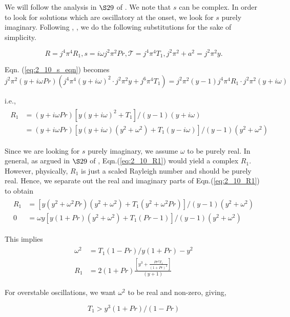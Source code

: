 We will follow the analysis in $\S 29$ of \cite{chandrasekhar1961hydrodynamic}. We note that $s$ can be complex. In order to look for solutions which are oscillatory at the onset, we look for $s$ purely imaginary. Following \cite{chandrasekhar1961hydrodynamic}, \cite{drazin2004hydrodynamic}, we do the following substitutions for the sake of simplicity. 

\begin{equation}\label{eq:2_10_substitutions}
 R = j^{4}\pi^{4}R_{1}, s = i \omega j^{2}\pi^{2} Pr, \mathcal{T} = j^{4}\pi^{4}T_{1}, j^{2}\pi^{2} + a^{2} = j^{2}\pi^{2} y.
\end{equation}

Eqn. (\ref{eq:2_10_s_eqn}) becomes
\begin{equation*}
 j^{2}\pi^{2}(y + i\omega Pr)\left(j^{4}\pi^{4}(y + i\omega)^{2} \cdot j^{2}\pi^{2}y + j^{6}\pi^{4}T_{1}\right) = j^{2}\pi^{2} (y-1)j^{4}\pi^{4}R_{1}\cdot j^{2}\pi^{2}(y + i\omega) 
\end{equation*}

i.e.,
\begin{align}\label{eq:2_10_R1}
 \begin{split}
  R_{1} &= (y + i\omega Pr)\left[y(y + i\omega)^{2} + T_{1} \right]/(y-1)(y+i\omega) \\
  & = (y + i\omega Pr)\left[y(y + i\omega)(y^{2}+\omega^{2}) + T_{1}(y-i\omega)\right]/(y-1)(y^{2}+\omega^{2})
 \end{split}
\end{align}

Since we are looking for $s$ purely imaginary, we assume $\omega$ to be purely real. In general, as argued in $\S 29$ of \cite{chandrasekhar1961hydrodynamic}, Eqn.(\ref{eq:2_10_R1}) would yield a complex $R_{1}$. However, physically, $R_{1}$ is just a scaled Rayleigh number and should be purely real. Hence, we separate out the real and imaginary parts of Eqn.(\ref{eq:2_10_R1}) to obtain
\begin{align}\label{eq:2_10_R1_re_im}
 \begin{split}
  R_{1} &= \left[y(y^{2} + \omega^{2}Pr) (y^{2}+\omega^{2}) + T_{1}(y^{2} + \omega^{2}Pr)\right]/(y-1)(y^{2}+\omega^{2})\\
  0 &= \omega y \left[y(1 + Pr)(y^{2}+\omega^{2}) + T_{1}(Pr - 1) \right]/(y-1)(y^{2}+\omega^{2})
 \end{split}
\end{align}

This implies
\begin{align}\label{eq:2_10_omega_R1_expressions}
 \begin{split}
  \omega^{2} &= T_{1}(1-Pr)/y(1+Pr) - y^{2}\\
  R_{1} &= 2(1+Pr) \frac{\left[y^{3} + \frac{Pr^{2}T_{1}}{(1+Pr)^{2}} \right]}{(y+1)}
 \end{split}
\end{align}

For overstable oscillations, we want $\omega^{2}$ to be real and non-zero, giving, 

\begin{equation}\label{eq:2_10_overstability_cond}
 \boxed{
 T_{1} > y^{3} (1+Pr)/(1-Pr)
 }
\end{equation}



